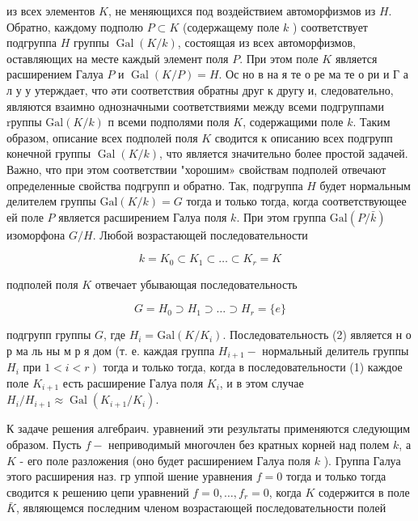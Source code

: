 \documentclass[10pt]{article}
\begin{document}
из всех элементов $K$, не меняющихся под воздействием автоморфизмов из $H$. Обратно, каждому подполю $P \subset K$ (содержащему поле $k$ ) соответствует подгруппа $H$ группы $\operatorname{Gal}(K / k)$, состоящая из всех автоморфизмов, оставляющих на месте каждый элемент поля $P$. При этом поле $K$ является расширением Галуа $P$ и $\operatorname{Gal}(K / P)=H$. Ос но в на я те о ре ма те о ри и Г а л у у утерждает, что әти соответствия обратны друг к другу и, следовательно, являются взаимно однозначными соответствиями между всеми подгруппами rруппы $\mathrm{Gal}(K / k)$ п всеми подполями поля $K$, содержащими поле $k$. Таким образом, описание всех подполей поля $K$ сводится к описанию всех подгрупп конечной группы $\operatorname{Gal}(K / k)$, что является значительно более простой задачей. Важно, что при этом соответствии "хорошим» свойствам подполей отвечают определенные свойства подгрупп и обратно. Так, подгруппа $H$ будет нормальным делителем группы $\mathrm{Gal}(K / k)=G$ тогда и только тогда, когда соответствующее ей поле $P$ является расширением Галуа поля $k$. При этом группа $\mathrm{Gal}(P / \bar{k})$ изоморфона $G / H$. Любой возрастающей последовательности



\[

k=K_{0} \subset K_{1} \subset \ldots \subset K_{r}=K

\]



подполей поля $K$ отвечает убывающая последовательность



\[

G=H_{0} \supset H_{1} \supset \ldots \supset H_{r}=\{e\}

\]



подгрупп группы $G$, где $H_{i}=\mathrm{Gal}\left(K / K_{i}\right)$. Последовательность (2) является н о р ма ль ны м р я дом (т. е. каждая группа $H_{i+1}-$ нормальный делитель группы $H_{i}$ при $\left.1<i<r\right)$ тогда и только тогда, когда в последовательности (1) каждое поле $K_{i+1}$ есть расширение Галуа поля $K_{i}$, и в этом случае $H_{i} / H_{i+1} \approx \operatorname{Gal}\left(K_{i+1} / K_{i}\right)$.



К задаче решения алгебраич. уравнений эти результаты применяются следующим образом. Пусть $f-$ неприводимый многочлен без кратных корней над полем $k$, а $K$ - его поле разложения (оно будет расширением Галуа поля $k$ ). Группа Галуа этого расширения наз. гр уппой шение уравнения $f=0$ тогда и только тогда сводится к решению цепи уравнений $f=0, \ldots, f_{r}=0$, когда $K$ содержится в поле $\bar{K}$, являющемся последним членом возрастающей последовательности полей
\end{document}
